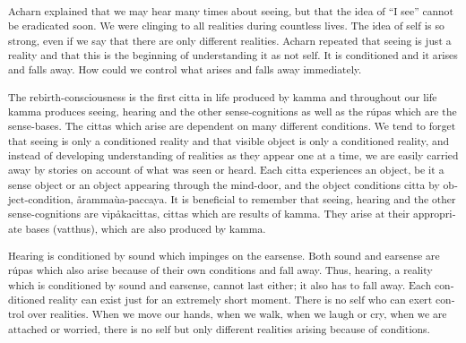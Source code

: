 \textsuperscript{\textportuguese{Acharn}\textdutch{ explained that we
may hear many times about seeing, but that the idea of ``I see'' cannot
be eradicated soon. We were clinging to all realities during countless
lives. }\textenglish[variant=american]{The idea of self is so strong,
even if we say that there are only different realities.
}\textdutch{Acharn repeated that seeing is just a reality and that this
is the beginning of understanding it as not self. It is conditioned and
it arises and falls away. How could we control what arises and falls
away immediately. }}

\textsuperscript{\textdutch{The rebirth-consciousness is the first citta
in life produced by kamma and throughout our life kamma produces seeing,
hearing and the other sense-cognitions as well as the rúpas which are
the sense-bases. }\textenglish[variant=american]{The cittas which arise
are dependent on many different conditions. We tend to forget that
seeing is only a conditioned reality and that visible object is only a
conditioned reality, and }\textdutch{instead of developing understanding
of realities as they appear one at a time,
}\textenglish[variant=american]{we are easily carried away
by}\textdutch{ stories on account of what was seen or heard.
}\textenglish[variant=american]{Each citta experiences an object, be it
a sense object or }\textdutch{an }\textfrench{object}\textdutch{
appearing through the mind-door}\textenglish[variant=american]{, and the
object conditions citta by object-condition,
}\textdutch{årammaùa-}\textenglish[variant=american]{paccaya. It is
beneficial to remember that seeing, hearing and the other
sense-cognitions are
vip}\textdutch{å}\textenglish[variant=american]{kacittas, cittas which
are results of kamma. They arise at their appropriate bases}\textdutch{
(}\textenglish[variant=american]{vatthus}\textdutch{)}\textenglish[variant=american]{,
which are also produced by kamma. }}

\textsuperscript{\textenglish[variant=american]{Hearing is conditioned
by sound which impinges on the earsense. Both sound and earsense are
r}\textdutch{ú}\textenglish[variant=american]{pas which also arise
because of their own conditions and fall away. Thus, hearing,
}\textdutch{a}\textenglish[variant=american]{ reality}\textdutch{ which
is conditioned by sound and earsense,}\textenglish[variant=american]{
cannot last either; it also has to fall away. Each conditioned reality
can exist just for an extremely short moment.
}\textdutch{T}\textenglish[variant=american]{here is no self who can
exert control over realities. When we move our hands, when we walk, when
we laugh or cry, when we are attached or worried, there }\textdutch{is
no self but only different realities arising because of conditions.}}


